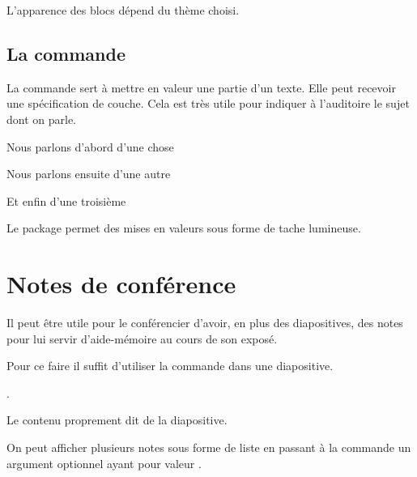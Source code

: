 L'apparence des blocs dépend du thème choisi.

\subsection{La commande }

La commande  sert à mettre en valeur une partie d'un texte. Elle peut recevoir une spécification de couche. Cela est très utile pour indiquer à l'auditoire le sujet dont on parle. 

\begin{latexcode}
\begin{frame}
\begin{description}
	\item\alert<1>{Nous parlons d'abord d'une chose}
	\item\alert<2>{Nous parlons ensuite d'une autre}
	\item\alert<3>{Et enfin d'une troisième}
\end{description}
\end{frame}
\end{latexcode}

\begin{plusloins}

Le package  permet des mises en valeurs sous forme de tache lumineuse.

\end{plusloins}
\section{Notes de conférence}

Il peut être utile pour le conférencier d'avoir, en plus des diapositives, des notes pour lui servir d'aide-mémoire au cours de son exposé.

Pour ce faire il suffit d'utiliser la commande  dans une diapositive.

\begin{latexcode}
\begin{frame}
.
	
Le contenu proprement dit de la diapositive.
\end{frame}
\end{latexcode}

On peut afficher plusieurs notes sous forme de liste en passant  à la commande  un argument optionnel ayant pour valeur .

